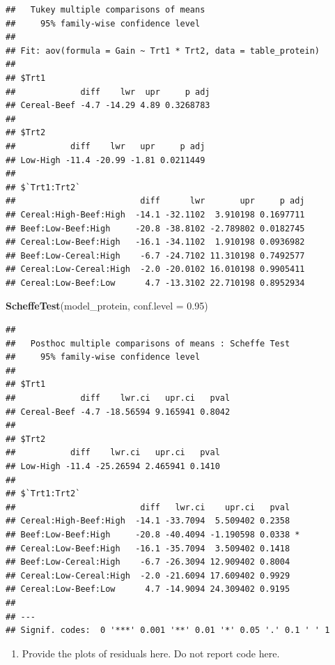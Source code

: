 \documentclass[11pt,]{article}
\newenvironment{Shaded}{\begin{snugshade}}{\end{snugshade}}
\newcommand{\DataTypeTok}[1]{\textcolor[rgb]{0.13,0.29,0.53}{#1}}
\newcommand{\FloatTok}[1]{\textcolor[rgb]{0.00,0.00,0.81}{#1}}
\newcommand{\KeywordTok}[1]{\textcolor[rgb]{0.13,0.29,0.53}{\textbf{#1}}}
\newcommand{\NormalTok}[1]{#1}
\providecommand{\tightlist}{%
\setlength{\itemsep}{0pt}\setlength{\parskip}{0pt}}
\begin{document}
\begin{verbatim}
##   Tukey multiple comparisons of means
##     95% family-wise confidence level
## 
## Fit: aov(formula = Gain ~ Trt1 * Trt2, data = table_protein)
## 
## $Trt1
##             diff    lwr  upr     p adj
## Cereal-Beef -4.7 -14.29 4.89 0.3268783
## 
## $Trt2
##           diff    lwr   upr     p adj
## Low-High -11.4 -20.99 -1.81 0.0211449
## 
## $`Trt1:Trt2`
##                         diff      lwr       upr     p adj
## Cereal:High-Beef:High  -14.1 -32.1102  3.910198 0.1697711
## Beef:Low-Beef:High     -20.8 -38.8102 -2.789802 0.0182745
## Cereal:Low-Beef:High   -16.1 -34.1102  1.910198 0.0936982
## Beef:Low-Cereal:High    -6.7 -24.7102 11.310198 0.7492577
## Cereal:Low-Cereal:High  -2.0 -20.0102 16.010198 0.9905411
## Cereal:Low-Beef:Low      4.7 -13.3102 22.710198 0.8952934
\end{verbatim}

\begin{Shaded}
\begin{Highlighting}[]
\KeywordTok{ScheffeTest}\NormalTok{(model_protein, }\DataTypeTok{conf.level =} \FloatTok{0.95}\NormalTok{)}
\end{Highlighting}
\end{Shaded}

\begin{verbatim}
## 
##   Posthoc multiple comparisons of means : Scheffe Test 
##     95% family-wise confidence level
## 
## $Trt1
##             diff    lwr.ci   upr.ci   pval    
## Cereal-Beef -4.7 -18.56594 9.165941 0.8042    
## 
## $Trt2
##           diff    lwr.ci   upr.ci   pval    
## Low-High -11.4 -25.26594 2.465941 0.1410    
## 
## $`Trt1:Trt2`
##                         diff   lwr.ci    upr.ci   pval    
## Cereal:High-Beef:High  -14.1 -33.7094  5.509402 0.2358    
## Beef:Low-Beef:High     -20.8 -40.4094 -1.190598 0.0338 *  
## Cereal:Low-Beef:High   -16.1 -35.7094  3.509402 0.1418    
## Beef:Low-Cereal:High    -6.7 -26.3094 12.909402 0.8004    
## Cereal:Low-Cereal:High  -2.0 -21.6094 17.609402 0.9929    
## Cereal:Low-Beef:Low      4.7 -14.9094 24.309402 0.9195    
## 
## ---
## Signif. codes:  0 '***' 0.001 '**' 0.01 '*' 0.05 '.' 0.1 ' ' 1
\end{verbatim}

\begin{enumerate}
\def\labelenumi{(\alph{enumi})}
\setcounter{enumi}{4}
\tightlist
\item
  Provide the plots of residuals here. Do not report code here.
\end{enumerate}
\end{document}
